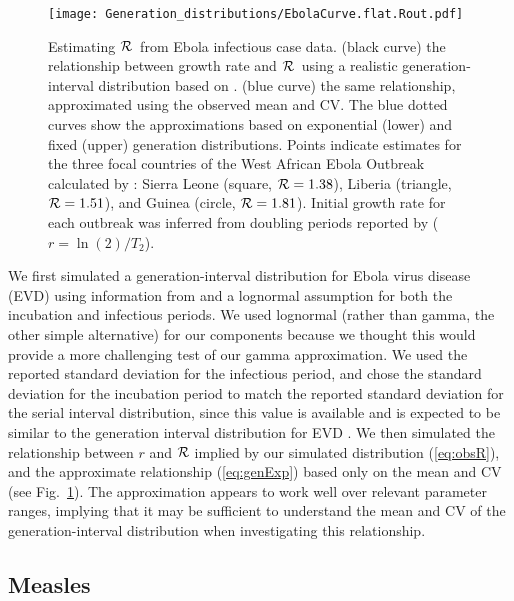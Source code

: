\documentclass[12pt]{article}
\newcommand{\RR}{\ensuremath{{\cal R}}}
\newcommand{\eref}[1]{(\ref{eq:#1})}
\newcommand{\fref}[1]{Fig.~\ref{fig:#1}}
\begin{document}
{\begin{figure}[htbp] \centering
	\texttt{[image: Generation\_distributions/EbolaCurve.flat.Rout.pdf]}
	\caption{Estimating \RR~from Ebola infectious case data.
(black curve) the relationship between growth rate and \RR~using a realistic generation-interval distribution based on \cite{AylwBarb14}.
(blue curve) the same relationship, approximated using the observed mean and CV. 
The blue dotted curves show the approximations based on exponential (lower) and fixed (upper) generation distributions.
Points indicate estimates for the three focal countries of the West African Ebola Outbreak calculated by \cite{AylwBarb14}: {Sierra Leone (square, $\RR=1.38$), Liberia (triangle, $\RR=1.51$), and Guinea (circle, $\RR=1.81$).} Initial growth rate for each outbreak was inferred from doubling periods reported by \cite{AylwBarb14} ($r = \ln(2)/T_2$).
	\label{fig:EbolaCurve}}
\end{figure}

We first simulated a generation-interval distribution for Ebola virus disease (EVD) using information from \cite{AylwBarb14} and a lognormal assumption for both the incubation and infectious periods.
We used lognormal (rather than gamma, the other simple alternative) for our components because we thought this would provide a more challenging test of our gamma approximation. 
We used the reported standard deviation for the infectious period, and chose the standard deviation for the incubation period to match the reported standard deviation for the serial interval distribution, since this value is available and is expected to be similar to the generation interval distribution for EVD \cite{AylwBarb14}.
We  then simulated the relationship between $r$ and $\RR$ implied by our simulated distribution \eref{obsR}, and the approximate relationship \eref{genExp} based only on the mean and CV (see \fref{EbolaCurve}). The approximation appears to work well over relevant parameter ranges, implying that it may be sufficient to understand the mean and CV of the generation-interval distribution when investigating this relationship.

\subsection{Measles}

}
\end{document}
